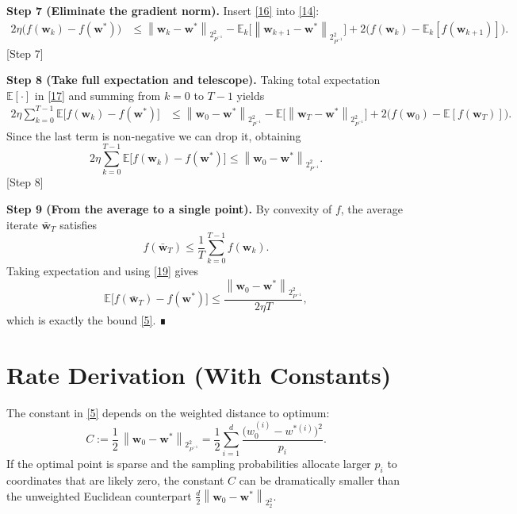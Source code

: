 \documentclass{article}
\newcommand{\E}{\mathbb{E}}
\newcommand{\norm}[2][2]{\left\lVert #2\right\rVert_{#1}}
\begin{document}
\noindent\textbf{Step 7 (Eliminate the gradient norm).}  
Insert \eqref{16} into \eqref{14}:
\begin{align}
2\eta\big(f(\mathbf{w}_{k})-f(\mathbf{w}^{*})\big)
&\le
\norm{\mathbf{w}_{k}-\mathbf{w}^{*}}_{P^{-1}}^{2}
-\E_k\!\big[\norm{\mathbf{w}_{k+1}-\mathbf{w}^{*}}_{P^{-1}}^{2}\big]
+2\big(f(\mathbf{w}_{k})-\E_k[f(\mathbf{w}_{k+1})]\big).
\tag{17}
\end{align}
[Step 7]

\noindent\textbf{Step 8 (Take full expectation and telescope).}  
Taking total expectation $\E[\cdot]$ in \eqref{17} and summing from $k=0$ to $T-1$ yields
\begin{align}
2\eta \sum_{k=0}^{T-1}\E\!\big[f(\mathbf{w}_{k})-f(\mathbf{w}^{*})\big]
&\le
\norm{\mathbf{w}_{0}-\mathbf{w}^{*}}_{P^{-1}}^{2}
- \E\!\big[\norm{\mathbf{w}_{T}-\mathbf{w}^{*}}_{P^{-1}}^{2}\big]
+2\big(f(\mathbf{w}_{0})-\E[f(\mathbf{w}_{T})]\big).
\tag{18}
\end{align}
Since the last term is non‑negative we can drop it, obtaining
\[
2\eta \sum_{k=0}^{T-1}\E\!\big[f(\mathbf{w}_{k})-f(\mathbf{w}^{*})\big]
\le
\norm{\mathbf{w}_{0}-\mathbf{w}^{*}}_{P^{-1}}^{2}.
\tag{19}
\]
[Step 8]

\noindent\textbf{Step 9 (From the average to a single point).}  
By convexity of $f$, the average iterate $\bar{\mathbf{w}}_{T}$ satisfies
\[
f(\bar{\mathbf{w}}_{T})\le \frac{1}{T}\sum_{k=0}^{T-1} f(\mathbf{w}_{k}) .
\]
Taking expectation and using \eqref{19} gives
\[
\E\!\big[f(\bar{\mathbf{w}}_{T})-f(\mathbf{w}^{*})\big]
\le
\frac{\norm{\mathbf{w}_{0}-\mathbf{w}^{*}}_{P^{-1}}^{2}}{2\eta T},
\]
which is exactly the bound \eqref{5}. ∎

\section*{Rate Derivation (With Constants)}
The constant in \eqref{5} depends on the weighted distance to optimum:
\[
C:=\frac12\,\norm{\mathbf{w}_{0}-\mathbf{w}^{*}}_{P^{-1}}^{2}
= \frac12\sum_{i=1}^{d}\frac{\big(w_{0}^{(i)}-w^{* (i)}\big)^{2}}{p_i}.
\]
If the optimal point is sparse and the sampling probabilities allocate larger $p_i$ to coordinates that are likely zero, the constant $C$ can be dramatically smaller than the unweighted Euclidean counterpart $ \frac{d}{2}\norm{\mathbf{w}_{0}-\mathbf{w}^{*}}_{2}^{2}$.
\end{document}

